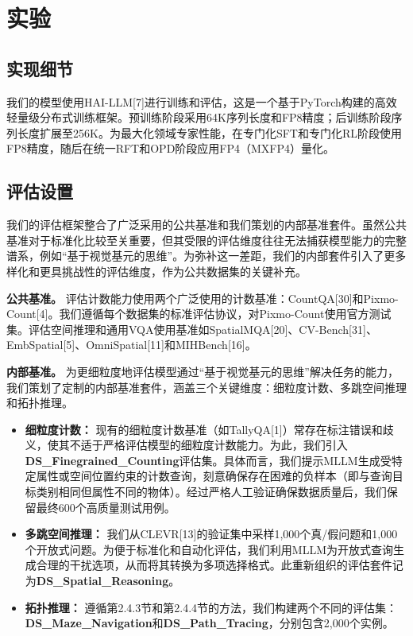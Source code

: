 \documentclass[11pt,a4paper]{article}
\begin{document}
\section{实验}

\subsection{实现细节}

我们的模型使用HAI-LLM[7]进行训练和评估，这是一个基于PyTorch构建的高效轻量级分布式训练框架。预训练阶段采用64K序列长度和FP8精度；后训练阶段序列长度扩展至256K。为最大化领域专家性能，在专门化SFT和专门化RL阶段使用FP8精度，随后在统一RFT和OPD阶段应用FP4（MXFP4）量化。

\subsection{评估设置}

我们的评估框架整合了广泛采用的公共基准和我们策划的内部基准套件。虽然公共基准对于标准化比较至关重要，但其受限的评估维度往往无法捕获模型能力的完整谱系，例如“基于视觉基元的思维”。为弥补这一差距，我们的内部套件引入了更多样化和更具挑战性的评估维度，作为公共数据集的关键补充。

\textbf{公共基准。} 评估计数能力使用两个广泛使用的计数基准：CountQA[30]和Pixmo-Count[4]。我们遵循每个数据集的标准评估协议，对Pixmo-Count使用官方测试集。评估空间推理和通用VQA使用基准如SpatialMQA[20]、CV-Bench[31]、EmbSpatial[5]、OmniSpatial[11]和MIHBench[16]。

\textbf{内部基准。} 为更细粒度地评估模型通过“基于视觉基元的思维”解决任务的能力，我们策划了定制的内部基准套件，涵盖三个关键维度：细粒度计数、多跳空间推理和拓扑推理。

\begin{itemize}
    \item \textbf{细粒度计数：} 现有的细粒度计数基准（如TallyQA[1]）常存在标注错误和歧义，使其不适于严格评估模型的细粒度计数能力。为此，我们引入\textbf{DS\_Finegrained\_Counting}评估集。具体而言，我们提示MLLM生成受特定属性或空间位置约束的计数查询，刻意确保存在困难的负样本（即与查询目标类别相同但属性不同的物体）。经过严格人工验证确保数据质量后，我们保留最终600个高质量测试用例。
    \item \textbf{多跳空间推理：} 我们从CLEVR[13]的验证集中采样1,000个真/假问题和1,000个开放式问题。为便于标准化和自动化评估，我们利用MLLM为开放式查询生成合理的干扰选项，从而将其转换为多项选择格式。此重新组织的评估套件记为\textbf{DS\_Spatial\_Reasoning}。
    \item \textbf{拓扑推理：} 遵循第2.4.3节和第2.4.4节的方法，我们构建两个不同的评估集：\textbf{DS\_Maze\_Navigation}和\textbf{DS\_Path\_Tracing}，分别包含2,000个实例。
\end{itemize}
\end{document}

